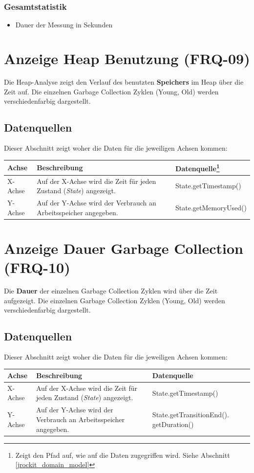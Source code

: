 \subsubsection{Gesamtstatistik}
\begin{itemize}
	\item Dauer der Messung in Sekunden
\end{itemize}

\section{Anzeige Heap Benutzung (FRQ-09)}
Die Heap-Analyse zeigt den Verlauf des benutzten \textbf{Speichers} im Heap über die Zeit auf. Die einzelnen Garbage Collection Zyklen (Young, Old) werden verschiedenfarbig dargestellt.

\subsection{Datenquellen}
Dieser Abschnitt zeigt woher die Daten für die jeweiligen Achsen kommen:
  \begin{longtable}{|p{1.5cm}|p{5.5cm}|p{4cm}|}
\hline
  \textbf{Achse} & \textbf{Beschreibung} & \textbf{Datenquelle\footnote{Zeigt den Pfad auf, wie auf die Daten zugegriffen wird. Siehe Abschnitt \ref{jrockit_domain_model}}}\\\hline
  X-Achse & Auf der X-Achse wird die Zeit für jeden Zustand (\textit{State}) angezeigt. & State.getTimestamp()\\\hline
  Y-Achse&Auf der Y-Achse wird der Verbrauch an Arbeitsspeicher angegeben. & State.getMemoryUsed()\\\hline
\end{longtable}

\section{Anzeige Dauer Garbage Collection (FRQ-10)}
Die \textbf{Dauer} der einzelnen Garbage Collection Zyklen wird über die Zeit aufgezeigt. Die einzelnen Garbage Collection Zyklen (Young, Old) werden verschiedenfarbig dargestellt.

\subsection{Datenquellen}
Dieser Abschnitt zeigt woher die Daten für die jeweiligen Achsen kommen:  \begin{longtable}{|p{1.5cm}|p{5.5cm}|p{4cm}|}
\hline
  \textbf{Achse} & \textbf{Beschreibung} & \textbf{Datenquelle}\\\hline
  X-Achse & Auf der X-Achse wird die Zeit für jeden Zustand (\textit{State}) angezeigt. & State.getTimestamp()\\\hline
  Y-Achse&Auf der Y-Achse wird der Verbrauch an Arbeitsspeicher angegeben. & State.getTransitionEnd(). getDuration()\\\hline
\end{longtable}

